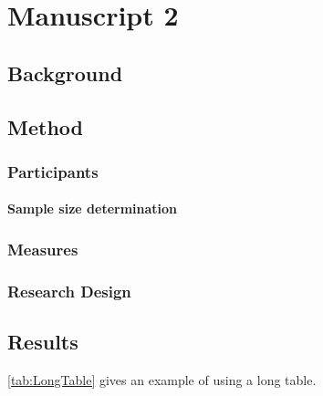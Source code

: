 \chapter{Manuscript 2}


\vspace{3\parsep} %

\lipsum[1]

\section{Background}
\lipsum[1]

\section{Method}

\subsection{Participants}
\lipsum[1]

\subsubsection{Sample size determination} 
\lipsum[1]

\subsection{Measures}
\lipsum[1]

\subsection{Research Design}
\lipsum[1]




\section{Results}



\ref{tab:LongTable} gives an example of using a long table.





